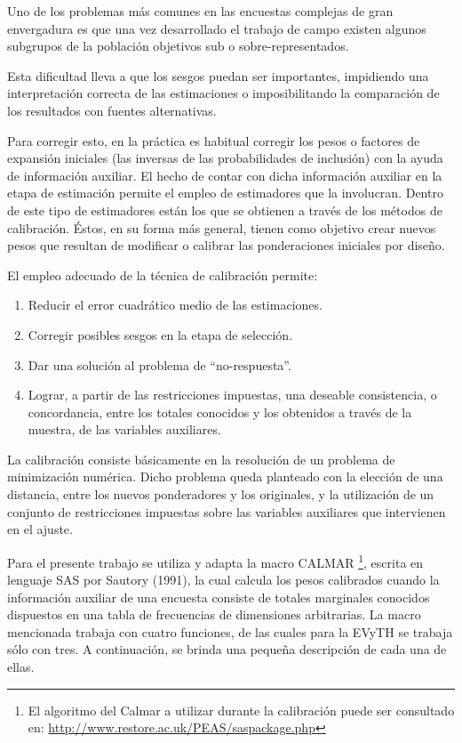 \documentclass[
  openany]{book}
\begin{document}
Uno de los problemas más comunes en las encuestas complejas de gran envergadura es que una vez desarrollado el trabajo de campo existen algunos subgrupos de la población objetivos sub o sobre-representados.

Esta dificultad lleva a que los sesgos puedan ser importantes, impidiendo una interpretación correcta de las estimaciones o imposibilitando la comparación de los resultados con fuentes alternativas.

Para corregir esto, en la práctica es habitual corregir los pesos o factores de expansión iniciales (las inversas de las probabilidades de inclusión) con la ayuda de información auxiliar. El hecho de contar con dicha información auxiliar en la etapa de estimación permite el empleo de estimadores que la involucran. Dentro de este tipo de estimadores están los que se obtienen a través de los métodos de calibración. Éstos, en su forma más general, tienen como objetivo crear nuevos pesos que resultan de modificar o calibrar las ponderaciones iniciales por diseño.

El empleo adecuado de la técnica de calibración permite:

\begin{enumerate}
\def\labelenumi{\arabic{enumi}.}
\item
  Reducir el error cuadrático medio de las estimaciones.
\item
  Corregir posibles sesgos en la etapa de selección.
\item
  Dar una solución al problema de ``no-respuesta''.
\item
  Lograr, a partir de las restricciones impuestas, una deseable consistencia, o concordancia, entre los totales conocidos y los obtenidos a través de la muestra, de las variables auxiliares.
\end{enumerate}

La calibración consiste básicamente en la resolución de un problema de minimización numérica. Dicho problema queda planteado con la elección de una distancia, entre los nuevos ponderadores y los originales, y la utilización de un conjunto de restricciones impuestas sobre las variables auxiliares que intervienen en el ajuste.

Para el presente trabajo se utiliza y adapta la macro CALMAR \footnote{El algoritmo del Calmar a utilizar durante la calibración puede ser consultado en: \url{http://www.restore.ac.uk/PEAS/saspackage.php}}, escrita en lenguaje SAS por Sautory (1991), la cual calcula los pesos calibrados cuando la información auxiliar de una encuesta consiste de totales marginales conocidos dispuestos en una tabla de frecuencias de dimensiones arbitrarias. La macro mencionada trabaja con cuatro funciones, de las cuales para la EVyTH se trabaja sólo con tres. A continuación, se brinda una pequeña descripción de cada una de ellas.
\end{document}
